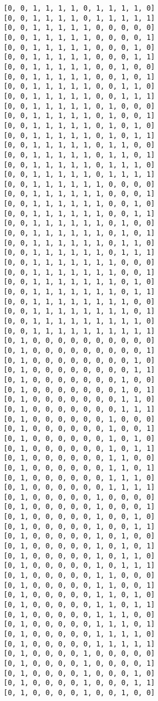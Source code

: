 \documentclass[11pt]{article}
\begin{document}
\begin{Verbatim}[commandchars=\\\{\}]
[0, 0, 1, 1, 1, 1, 0, 1, 1, 1, 1, 0]
[0, 0, 1, 1, 1, 1, 0, 1, 1, 1, 1, 1]
[0, 0, 1, 1, 1, 1, 1, 0, 0, 0, 0, 0]
[0, 0, 1, 1, 1, 1, 1, 0, 0, 0, 0, 1]
[0, 0, 1, 1, 1, 1, 1, 0, 0, 0, 1, 0]
[0, 0, 1, 1, 1, 1, 1, 0, 0, 0, 1, 1]
[0, 0, 1, 1, 1, 1, 1, 0, 0, 1, 0, 0]
[0, 0, 1, 1, 1, 1, 1, 0, 0, 1, 0, 1]
[0, 0, 1, 1, 1, 1, 1, 0, 0, 1, 1, 0]
[0, 0, 1, 1, 1, 1, 1, 0, 0, 1, 1, 1]
[0, 0, 1, 1, 1, 1, 1, 0, 1, 0, 0, 0]
[0, 0, 1, 1, 1, 1, 1, 0, 1, 0, 0, 1]
[0, 0, 1, 1, 1, 1, 1, 0, 1, 0, 1, 0]
[0, 0, 1, 1, 1, 1, 1, 0, 1, 0, 1, 1]
[0, 0, 1, 1, 1, 1, 1, 0, 1, 1, 0, 0]
[0, 0, 1, 1, 1, 1, 1, 0, 1, 1, 0, 1]
[0, 0, 1, 1, 1, 1, 1, 0, 1, 1, 1, 0]
[0, 0, 1, 1, 1, 1, 1, 0, 1, 1, 1, 1]
[0, 0, 1, 1, 1, 1, 1, 1, 0, 0, 0, 0]
[0, 0, 1, 1, 1, 1, 1, 1, 0, 0, 0, 1]
[0, 0, 1, 1, 1, 1, 1, 1, 0, 0, 1, 0]
[0, 0, 1, 1, 1, 1, 1, 1, 0, 0, 1, 1]
[0, 0, 1, 1, 1, 1, 1, 1, 0, 1, 0, 0]
[0, 0, 1, 1, 1, 1, 1, 1, 0, 1, 0, 1]
[0, 0, 1, 1, 1, 1, 1, 1, 0, 1, 1, 0]
[0, 0, 1, 1, 1, 1, 1, 1, 0, 1, 1, 1]
[0, 0, 1, 1, 1, 1, 1, 1, 1, 0, 0, 0]
[0, 0, 1, 1, 1, 1, 1, 1, 1, 0, 0, 1]
[0, 0, 1, 1, 1, 1, 1, 1, 1, 0, 1, 0]
[0, 0, 1, 1, 1, 1, 1, 1, 1, 0, 1, 1]
[0, 0, 1, 1, 1, 1, 1, 1, 1, 1, 0, 0]
[0, 0, 1, 1, 1, 1, 1, 1, 1, 1, 0, 1]
[0, 0, 1, 1, 1, 1, 1, 1, 1, 1, 1, 0]
[0, 0, 1, 1, 1, 1, 1, 1, 1, 1, 1, 1]
[0, 1, 0, 0, 0, 0, 0, 0, 0, 0, 0, 0]
[0, 1, 0, 0, 0, 0, 0, 0, 0, 0, 0, 1]
[0, 1, 0, 0, 0, 0, 0, 0, 0, 0, 1, 0]
[0, 1, 0, 0, 0, 0, 0, 0, 0, 0, 1, 1]
[0, 1, 0, 0, 0, 0, 0, 0, 0, 1, 0, 0]
[0, 1, 0, 0, 0, 0, 0, 0, 0, 1, 0, 1]
[0, 1, 0, 0, 0, 0, 0, 0, 0, 1, 1, 0]
[0, 1, 0, 0, 0, 0, 0, 0, 0, 1, 1, 1]
[0, 1, 0, 0, 0, 0, 0, 0, 1, 0, 0, 0]
[0, 1, 0, 0, 0, 0, 0, 0, 1, 0, 0, 1]
[0, 1, 0, 0, 0, 0, 0, 0, 1, 0, 1, 0]
[0, 1, 0, 0, 0, 0, 0, 0, 1, 0, 1, 1]
[0, 1, 0, 0, 0, 0, 0, 0, 1, 1, 0, 0]
[0, 1, 0, 0, 0, 0, 0, 0, 1, 1, 0, 1]
[0, 1, 0, 0, 0, 0, 0, 0, 1, 1, 1, 0]
[0, 1, 0, 0, 0, 0, 0, 0, 1, 1, 1, 1]
[0, 1, 0, 0, 0, 0, 0, 1, 0, 0, 0, 0]
[0, 1, 0, 0, 0, 0, 0, 1, 0, 0, 0, 1]
[0, 1, 0, 0, 0, 0, 0, 1, 0, 0, 1, 0]
[0, 1, 0, 0, 0, 0, 0, 1, 0, 0, 1, 1]
[0, 1, 0, 0, 0, 0, 0, 1, 0, 1, 0, 0]
[0, 1, 0, 0, 0, 0, 0, 1, 0, 1, 0, 1]
[0, 1, 0, 0, 0, 0, 0, 1, 0, 1, 1, 0]
[0, 1, 0, 0, 0, 0, 0, 1, 0, 1, 1, 1]
[0, 1, 0, 0, 0, 0, 0, 1, 1, 0, 0, 0]
[0, 1, 0, 0, 0, 0, 0, 1, 1, 0, 0, 1]
[0, 1, 0, 0, 0, 0, 0, 1, 1, 0, 1, 0]
[0, 1, 0, 0, 0, 0, 0, 1, 1, 0, 1, 1]
[0, 1, 0, 0, 0, 0, 0, 1, 1, 1, 0, 0]
[0, 1, 0, 0, 0, 0, 0, 1, 1, 1, 0, 1]
[0, 1, 0, 0, 0, 0, 0, 1, 1, 1, 1, 0]
[0, 1, 0, 0, 0, 0, 0, 1, 1, 1, 1, 1]
[0, 1, 0, 0, 0, 0, 1, 0, 0, 0, 0, 0]
[0, 1, 0, 0, 0, 0, 1, 0, 0, 0, 0, 1]
[0, 1, 0, 0, 0, 0, 1, 0, 0, 0, 1, 0]
[0, 1, 0, 0, 0, 0, 1, 0, 0, 0, 1, 1]
[0, 1, 0, 0, 0, 0, 1, 0, 0, 1, 0, 0]

\end{Verbatim}
\end{document}
